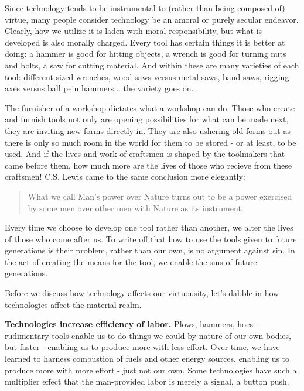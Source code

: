 \documentclass[letterpaper]{article}
\begin{document}
Since technology tends to be instrumental to (rather than being composed of) virtue, many people consider technology be an amoral or purely secular endeavor. Clearly, how we utilize it is laden with moral responsibility, but what is developed is also morally charged. Every tool has certain things it is better at doing: a hammer is good for hitting objects, a wrench is good for turning nuts and bolts, a saw for cutting material. And within these are many varieties of each tool: different sized wrenches, wood saws versus metal saws, band saws, rigging axes versus ball pein hammers... the variety goes on.

The furnisher of a workshop dictates what a workshop can do. Those who create and furnish tools not only are opening possibilities for what can be made next, they are inviting new forms directly in. They are also ushering old forms out as there is only so much room in the world for them to be stored - or at least, to be used. And if the lives and work of craftsmen is shaped by the toolmakers that came before them, how much more are the lives of those who recieve from these craftsmen! C.S. Lewis came to the same conclusion more elegantly:

\begin{quote}
  What we call Man's power over Nature turns out to be a power exercised by some men over other men with Nature as its instrument.
\end{quote}

Every time we choose to develop one tool rather than another, we alter the lives of those who come after us. To write off that how to use the tools given to future generations is their problem, rather than our own, is no argument against sin. In the act of creating the means for the tool, we enable the sins of future generations.

Before we discuss how technology affects our virtuousity, let's dabble in how technologies affect the material realm.

\textbf{Technologies increase efficiency of labor.} Plows, hammers, hoes - rudimentary tools enable us to do things we could by nature of our own bodies, but faster - enabling us to produce more with less effort. Over time, we have learned to harness combustion of fuels and other energy sources, enabling us to produce more with more effort - just not our own. Some technologies have such a multiplier effect that the man-provided labor is merely a signal, a button push.
\end{document}
